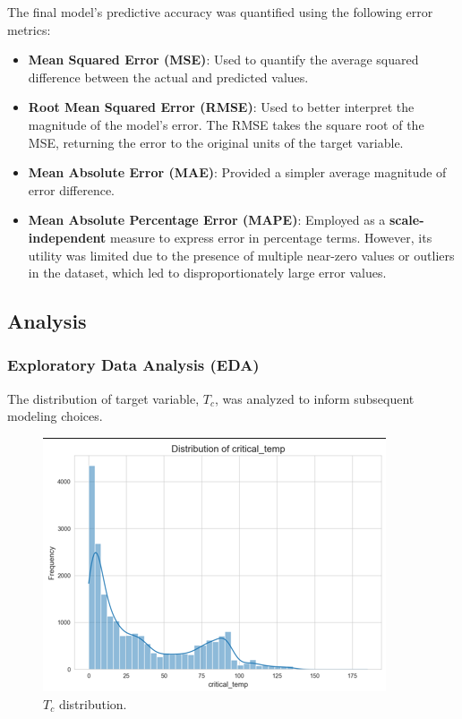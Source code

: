 \documentclass[conference]{IEEEtran}
\begin{document}
The final model's predictive accuracy was quantified using the following error metrics:
\begin{itemize}
	\item \textbf{Mean Squared Error (MSE)}: Used to quantify the average squared difference between the actual and predicted values.
	\item \textbf{Root Mean Squared Error (RMSE)}: Used to better interpret the magnitude of the model's error. The RMSE takes the square root of the MSE, returning the error to the original units of the target variable.
	\item \textbf{Mean Absolute Error (MAE)}: Provided a simpler average magnitude of error difference.
	\item \textbf{Mean Absolute Percentage Error (MAPE)}: Employed as a \textbf{scale-independent} measure to express error in percentage terms. However, its utility was limited due to the presence of multiple near-zero values or outliers in the dataset, which led to disproportionately large error values.\\
\end{itemize}

\subsection{\textbf{Analysis}}

\subsubsection{\textbf{Exploratory Data Analysis (EDA)}}
The distribution of target variable, $T_c$, was analyzed to inform subsequent modeling choices.
\begin{figure}[htbp]
	\centerline{\includegraphics[scale=0.7]{t_c_distritbution.png}}
	\caption{$T_c$ distribution.}
	\label{TcDist}
\end{figure}
\end{document}
